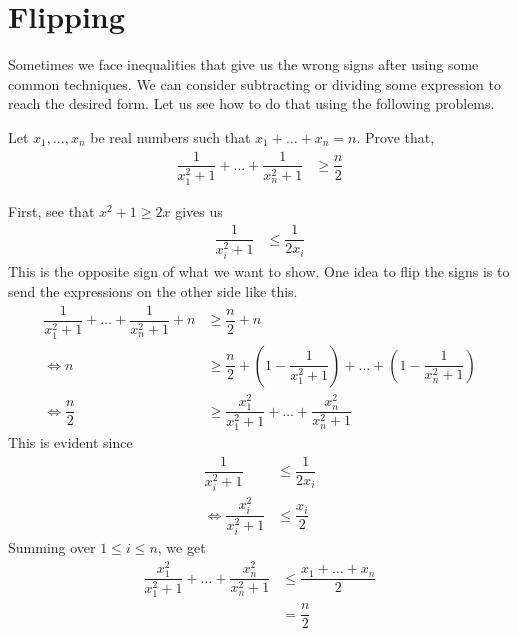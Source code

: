 \documentclass[inequalities.tex]{subfile}
\begin{document}
	\section{Flipping}\label{sec:flip}
	Sometimes we face inequalities that give us the wrong signs after using some common techniques. We can consider subtracting or dividing some expression to reach the desired form. Let us see how to do that using the following problems.
		\begin{problem}
			Let $x_{1},\ldots,x_{n}$ be real numbers such that $x_{1}+\ldots+x_{n}=n$. Prove that,
				\begin{align*}
					\dfrac{1}{x_{1}^{2}+1}+\ldots+\dfrac{1}{x_{n}^{2}+1}
						& \geq \dfrac{n}{2}
				\end{align*}

				\begin{solution}
					First, see that $x^{2}+1\geq 2x$ gives us
						\begin{align*}
							\dfrac{1}{x_{i}^{2}+1}
								& \leq \dfrac{1}{2x_{i}}
						\end{align*}
					This is the opposite sign of what we want to show. One idea to flip the signs is to send the expressions on the other side like this.
						\begin{align*}
							\dfrac{1}{x_{1}^{2}+1}+\ldots+\dfrac{1}{x_{n}^{2}+1}+n
								& \geq \dfrac{n}{2}+n\\
							\iff n
								& \geq \dfrac{n}{2}+\left(1-\dfrac{1}{x_{1}^{2}+1}\right)+\ldots+\left(1-\dfrac{1}{x_{n}^{2}+1}\right)\\
							\iff \dfrac{n}{2}
								& \geq \dfrac{x_{1}^{2}}{x_{1}^{2}+1}+\ldots+\dfrac{x_{n}^{2}}{x_{n}^{2}+1}
						\end{align*}
					This is evident since
						\begin{align*}
							\dfrac{1}{x_{i}^{2}+1}
								& \leq \dfrac{1}{2x_{i}}\\
							\iff \dfrac{x_{i}^{2}}{x_{i}^{2}+1}
								& \leq \dfrac{x_{i}}{2}
						\end{align*}
					Summing over $1\leq i\leq n$, we get
						\begin{align*}
							\dfrac{x_{1}^{2}}{x_{1}^{2}+1}+\ldots+\dfrac{x_{n}^{2}}{x_{n}^{2}+1}
								& \leq \dfrac{x_{1}+\ldots+x_{n}}{2}\\
								& = \dfrac{n}{2}
						\end{align*}
				\end{solution}
		\end{problem}
\end{document}
